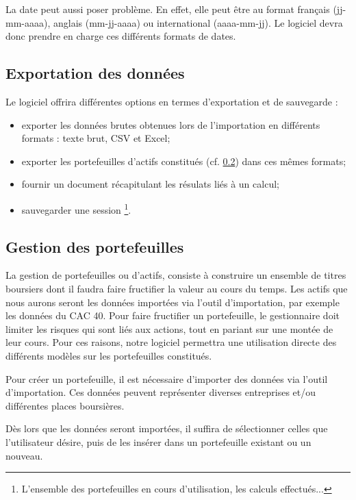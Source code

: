 		La date peut aussi poser problème. En effet, elle peut être au format français (jj-mm-aaaa), anglais (mm-jj-aaaa) ou international (aaaa-mm-jj). Le logiciel devra donc prendre en charge ces différents formats de dates.


	\subsection{Exportation des données}
		Le logiciel offrira différentes options en termes d'exportation et de sauvegarde :
		\begin{itemize}
			\item exporter les données brutes obtenues lors de l'importation en différents formats : texte brut, CSV et Excel;
			\item exporter les portefeuilles d'actifs constitués (cf. \ref{subsubsection:portefeuilles}) dans ces mêmes formats;
			\item fournir un document récapitulant les résulats liés à un calcul;
			\item sauvegarder une session \footnote{L'ensemble des portefeuilles en cours d'utilisation, les calculs effectués...}.
		\end{itemize}


	\subsection{Gestion des portefeuilles}
	\label{subsubsection:portefeuilles}

		La gestion de portefeuilles ou d'actifs, consiste à construire un ensemble de titres boursiers dont il faudra faire fructifier la valeur au cours du temps. Les actifs que nous aurons seront les données importées via l'outil d'importation, par exemple les données du CAC 40.
		Pour faire fructifier un portefeuille, le gestionnaire doit limiter les risques qui sont liés aux actions, tout en pariant sur une montée de leur cours. Pour ces raisons, notre logiciel permettra une utilisation directe des différents modèles sur les portefeuilles constitués.


		Pour créer un portefeuille, il est nécessaire d'importer des données via l'outil d'importation. Ces données peuvent représenter diverses entreprises et/ou différentes places boursières. 

		Dès lors que les données seront importées, il suffira de sélectionner celles que l'utilisateur désire, puis de les insérer dans un portefeuille existant ou un nouveau.

